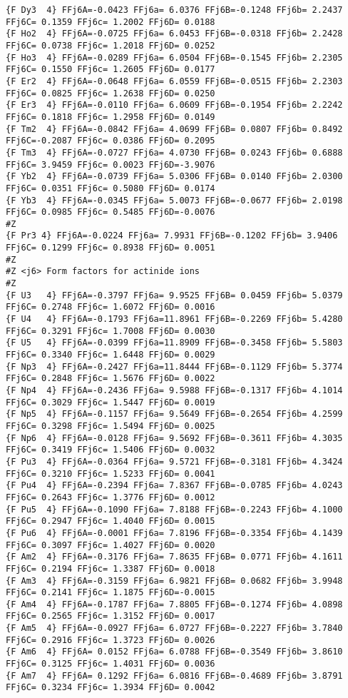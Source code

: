 {\begin{verbatim}
{F Dy3  4} FFj6A=-0.0423 FFj6a= 6.0376 FFj6B=-0.1248 FFj6b= 2.2437 FFj6C= 0.1359 FFj6c= 1.2002 FFj6D= 0.0188 
{F Ho2  4} FFj6A=-0.0725 FFj6a= 6.0453 FFj6B=-0.0318 FFj6b= 2.2428 FFj6C= 0.0738 FFj6c= 1.2018 FFj6D= 0.0252 
{F Ho3  4} FFj6A=-0.0289 FFj6a= 6.0504 FFj6B=-0.1545 FFj6b= 2.2305 FFj6C= 0.1550 FFj6c= 1.2605 FFj6D= 0.0177 
{F Er2  4} FFj6A=-0.0648 FFj6a= 6.0559 FFj6B=-0.0515 FFj6b= 2.2303 FFj6C= 0.0825 FFj6c= 1.2638 FFj6D= 0.0250 
{F Er3  4} FFj6A=-0.0110 FFj6a= 6.0609 FFj6B=-0.1954 FFj6b= 2.2242 FFj6C= 0.1818 FFj6c= 1.2958 FFj6D= 0.0149 
{F Tm2  4} FFj6A=-0.0842 FFj6a= 4.0699 FFj6B= 0.0807 FFj6b= 0.8492 FFj6C=-0.2087 FFj6c= 0.0386 FFj6D= 0.2095 
{F Tm3  4} FFj6A=-0.0727 FFj6a= 4.0730 FFj6B= 0.0243 FFj6b= 0.6888 FFj6C= 3.9459 FFj6c= 0.0023 FFj6D=-3.9076 
{F Yb2  4} FFj6A=-0.0739 FFj6a= 5.0306 FFj6B= 0.0140 FFj6b= 2.0300 FFj6C= 0.0351 FFj6c= 0.5080 FFj6D= 0.0174 
{F Yb3  4} FFj6A=-0.0345 FFj6a= 5.0073 FFj6B=-0.0677 FFj6b= 2.0198 FFj6C= 0.0985 FFj6c= 0.5485 FFj6D=-0.0076 
#Z
{F Pr3 4} FFj6A=-0.0224 FFj6a= 7.9931 FFj6B=-0.1202 FFj6b= 3.9406 FFj6C= 0.1299 FFj6c= 0.8938 FFj6D= 0.0051 
#Z
#Z <j6> Form factors for actinide ions
#Z
{F U3   4} FFj6A=-0.3797 FFj6a= 9.9525 FFj6B= 0.0459 FFj6b= 5.0379 FFj6C= 0.2748 FFj6c= 1.6072 FFj6D= 0.0016 
{F U4   4} FFj6A=-0.1793 FFj6a=11.8961 FFj6B=-0.2269 FFj6b= 5.4280 FFj6C= 0.3291 FFj6c= 1.7008 FFj6D= 0.0030 
{F U5   4} FFj6A=-0.0399 FFj6a=11.8909 FFj6B=-0.3458 FFj6b= 5.5803 FFj6C= 0.3340 FFj6c= 1.6448 FFj6D= 0.0029 
{F Np3  4} FFj6A=-0.2427 FFj6a=11.8444 FFj6B=-0.1129 FFj6b= 5.3774 FFj6C= 0.2848 FFj6c= 1.5676 FFj6D= 0.0022 
{F Np4  4} FFj6A=-0.2436 FFj6a= 9.5988 FFj6B=-0.1317 FFj6b= 4.1014 FFj6C= 0.3029 FFj6c= 1.5447 FFj6D= 0.0019 
{F Np5  4} FFj6A=-0.1157 FFj6a= 9.5649 FFj6B=-0.2654 FFj6b= 4.2599 FFj6C= 0.3298 FFj6c= 1.5494 FFj6D= 0.0025 
{F Np6  4} FFj6A=-0.0128 FFj6a= 9.5692 FFj6B=-0.3611 FFj6b= 4.3035 FFj6C= 0.3419 FFj6c= 1.5406 FFj6D= 0.0032 
{F Pu3  4} FFj6A=-0.0364 FFj6a= 9.5721 FFj6B=-0.3181 FFj6b= 4.3424 FFj6C= 0.3210 FFj6c= 1.5233 FFj6D= 0.0041 
{F Pu4  4} FFj6A=-0.2394 FFj6a= 7.8367 FFj6B=-0.0785 FFj6b= 4.0243 FFj6C= 0.2643 FFj6c= 1.3776 FFj6D= 0.0012 
{F Pu5  4} FFj6A=-0.1090 FFj6a= 7.8188 FFj6B=-0.2243 FFj6b= 4.1000 FFj6C= 0.2947 FFj6c= 1.4040 FFj6D= 0.0015 
{F Pu6  4} FFj6A=-0.0001 FFj6a= 7.8196 FFj6B=-0.3354 FFj6b= 4.1439 FFj6C= 0.3097 FFj6c= 1.4027 FFj6D= 0.0020 
{F Am2  4} FFj6A=-0.3176 FFj6a= 7.8635 FFj6B= 0.0771 FFj6b= 4.1611 FFj6C= 0.2194 FFj6c= 1.3387 FFj6D= 0.0018 
{F Am3  4} FFj6A=-0.3159 FFj6a= 6.9821 FFj6B= 0.0682 FFj6b= 3.9948 FFj6C= 0.2141 FFj6c= 1.1875 FFj6D=-0.0015 
{F Am4  4} FFj6A=-0.1787 FFj6a= 7.8805 FFj6B=-0.1274 FFj6b= 4.0898 FFj6C= 0.2565 FFj6c= 1.3152 FFj6D= 0.0017 
{F Am5  4} FFj6A=-0.0927 FFj6a= 6.0727 FFj6B=-0.2227 FFj6b= 3.7840 FFj6C= 0.2916 FFj6c= 1.3723 FFj6D= 0.0026 
{F Am6  4} FFj6A= 0.0152 FFj6a= 6.0788 FFj6B=-0.3549 FFj6b= 3.8610 FFj6C= 0.3125 FFj6c= 1.4031 FFj6D= 0.0036 
{F Am7  4} FFj6A= 0.1292 FFj6a= 6.0816 FFj6B=-0.4689 FFj6b= 3.8791 FFj6C= 0.3234 FFj6c= 1.3934 FFj6D= 0.0042 

\end{verbatim}
}